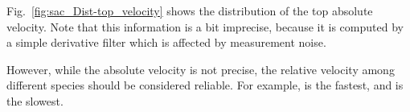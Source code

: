 Fig.~\ref{fig:sac_Dist-top_velocity} shows the distribution of the top absolute velocity. 
Note that this information is a bit imprecise, because it is computed by a simple derivative filter which is affected by measurement noise. 

However, while the absolute velocity is not precise, the relative velocity among different species should be considered reliable. For example, \Dmelanogaster is the fastest, and  \Dhydei is the slowest.

